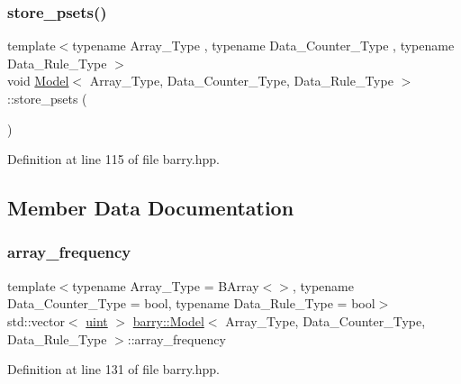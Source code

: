 \mbox{\label{classbarry_1_1_model_a06a6f52dfc6868908cf11e6663a93904}} 
\subsubsection{\texorpdfstring{store\+\_\+psets()}{store\_psets()}}
{\footnotesize\ttfamily template$<$typename Array\+\_\+\+Type , typename Data\+\_\+\+Counter\+\_\+\+Type , typename Data\+\_\+\+Rule\+\_\+\+Type $>$ \\
void \hyperlink{classbarry_1_1_model}{Model}$<$ Array\+\_\+\+Type, Data\+\_\+\+Counter\+\_\+\+Type, Data\+\_\+\+Rule\+\_\+\+Type $>$\+::store\+\_\+psets (\begin{DoxyParamCaption}{ }\end{DoxyParamCaption})\hspace{0.3cm}{\ttfamily [inline]}}



Definition at line 115 of file barry.\+hpp.



\subsection{Member Data Documentation}
\mbox{\label{classbarry_1_1_model_a64041df6ecac9aface20f9d13c0b22eb}} 
\subsubsection{\texorpdfstring{array\+\_\+frequency}{array\_frequency}}
{\footnotesize\ttfamily template$<$typename Array\+\_\+\+Type  = B\+Array$<$$>$, typename Data\+\_\+\+Counter\+\_\+\+Type  = bool, typename Data\+\_\+\+Rule\+\_\+\+Type  = bool$>$ \\
std\+::vector$<$ \hyperlink{namespacebarry_a11dfc53ddb4672278319aa04f1e09a6c}{uint} $>$ \hyperlink{classbarry_1_1_model}{barry\+::\+Model}$<$ Array\+\_\+\+Type, Data\+\_\+\+Counter\+\_\+\+Type, Data\+\_\+\+Rule\+\_\+\+Type $>$\+::array\+\_\+frequency}



Definition at line 131 of file barry.\+hpp.

